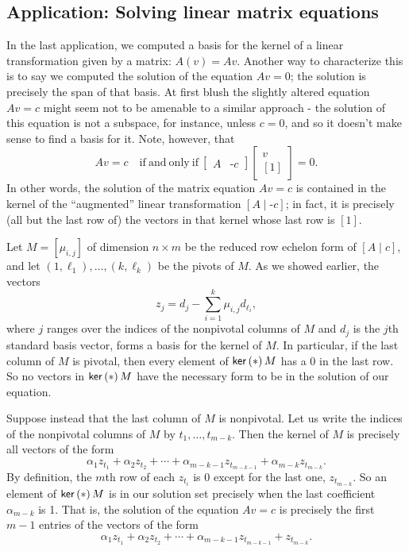 \documentclass{memoir}
\begin{document}
\setcounter{section}{10}
\setcounter{dfn}{14}

\subsection*{Application: Solving linear matrix equations}

In the last application, we computed a basis for the kernel of a linear transformation given by a matrix: $A(v) = Av$. Another way to characterize this is to say we computed the solution of the equation $Av = 0$; the solution is precisely the span of that basis. At first blush the slightly altered equation $Av = c$ might seem not to be amenable to a similar approach - the solution of this equation is not a subspace, for instance, unless $c = 0$, and so it doesn't make sense to find a basis for it. Note, however, that \[ Av = c \quad \mathrm{if\ and\ only\ if}\ \left[ \begin{array}{c|c} A & \text{-}c \end{array} \right] \left[ \begin{array}{c} v \\ \hline [1] \end{array} \right] = 0. \] In other words, the solution of the matrix equation $Av = c$ is contained in the kernel of the ``augmented'' linear transformation $[A \mid \text{-}c]$; in fact, it is precisely (all but the last row of) the vectors in that kernel whose last row is $[1]$.

Let $M = [\mu_{i,j}]$ of dimension $n \times m$ be the reduced row echelon form of $[A \mid c]$, and let $(1,\ell_1), \ldots, (k,\ell_k)$ be the pivots of $M$. As we showed earlier, the vectors \[  z_j = d_j - \sum_{i=1}^k \mu_{i,j} d_{\ell_i}, \] where $j$ ranges over the indices of the nonpivotal columns of $M$ and $d_j$ is the $j$th standard basis vector, forms a basis for the kernel of $M$. In particular, if the last column of $M$ is pivotal, then every element of $\operatorname{\mathsf{ker}}\left(*\right){M}$ has a 0 in the last row. So no vectors in $\operatorname{\mathsf{ker}}\left(*\right){M}$ have the necessary form to be in the solution of our equation.

Suppose instead that the last column of $M$ is nonpivotal. Let us write the indices of the nonpivotal columns of $M$ by $t_1, \ldots, t_{m-k}$. Then the kernel of $M$ is precisely all vectors of the form \[ \alpha_1 z_{t_1} + \alpha_2 z_{t_2} + \cdots + \alpha_{m-k-1} z_{t_{m-k-1}} + \alpha_{m-k} z_{t_{m-k}}. \] By definition, the $m$th row of each $z_{t_i}$ is 0 except for the last one, $z_{t_{m-k}}$. So an element of $\operatorname{\mathsf{ker}}\left(*\right){M}$ is in our solution set precisely when the last coefficient $\alpha_{m-k}$ is 1. That is, the solution of the equation $Av = c$ is precisely the first $m-1$ entries of the vectors of the form \[ \alpha_1 z_{t_1} + \alpha_2 z_{t_2} + \cdots + \alpha_{m-k-1} z_{t_{m-k-1}} + z_{t_{m-k}}. \]
\end{document}
